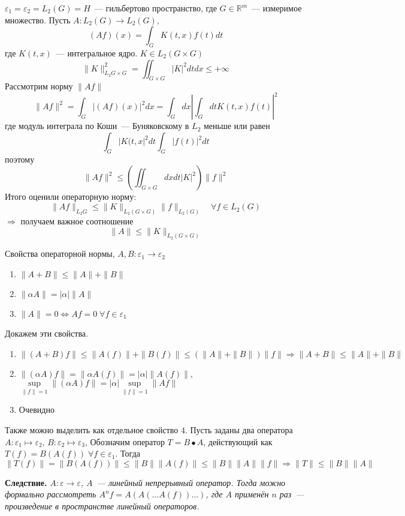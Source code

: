 \documentclass[14pt]{extarticle}
\begin{document}
\begin{Prim}
    $\varepsilon_1 = \varepsilon_2 = L_2(G) = H$~--- гильбертово пространство, где $G \in \mathbb R^m$~--- измеримое множество.
    Пусть $A : L_2(G) \to L_2(G)$, 
    $$
    (Af)(x) = \int_G K(t, x) f(t) dt
    $$
    где $K(t, x)$~--- интегральное ядро.
    $K \in L_2(G \times G) $ 
    $$
    \|K\|^2_{L_2{G \times G}} = \iint_{G \times G} |K|^2 dt dx \le +\infty
    $$
    Рассмотрим норму $\|Af\|$
    $$
    \|Af\|^2 = \int_{G} |(Af)(x)|^2 dx = \int_G dx \left| \int_G dt K(t, x) f(t) \right|^2
    $$
    где модуль интеграла по Коши~--- Буняковскому в $L_2$ 
    меньше или равен 
    $$
    \int_G |K(t, x|^2 dt \int_G |f(t)|^2 dt
    $$
    поэтому
    $$
    \|Af\|^2 \le \left(\iint_{G \times G} dx dt |K|^2 \right)\|f\|^2
    $$
    Итого оценили операторную норму:
    $$
    \|Af\|_{L_2{G}} \le \|K\|_{L_2(G \times G)}\|f\|_{L_2(G)} \quad \forall f \in L_2(G)
    $$
    $\Rightarrow$ получаем важное соотношение
    $$
    \boxed{\|A\| \le \|K\|_{L_2(G \times G)}}
    $$
\end{Prim}

Свойства операторной нормы, $A, B : \varepsilon_1 \to \varepsilon_2$
\begin{enumerate}
    \item{$\|A + B\| \le \|A\| + \|B\|$}
    \item{$\|\alpha A\| = |\alpha| \|A\|$}
    \item{$\|A\| = 0 \Leftrightarrow Af = 0 \; \forall f \in \varepsilon_1$}
\end{enumerate}
Докажем эти свойства.
\begin{enumerate}
    \item{$\|(A + B)f\| \le \|A(f)\| + \|B(f)\| \le (\|A\| + \|B\|)\|f\| \Rightarrow \|A + B\| \le \|A\| + \|B\|$}
    \item{$\|(\alpha A)f\| = \|\alpha A(f)\| = |\alpha| \|A(f)\|$, $\sup \limits_{\|f\| = 1} \|(\alpha A)f\| = |\alpha| \sup \limits_{\|f\| = 1} \|Af\|$}
    \item{Очевидно}
\end{enumerate}
Также можно выделить как отдельное свойство 4.
Пусть заданы два оператора $A : \varepsilon_1 \mapsto \varepsilon_2$, $B : \varepsilon_2 \mapsto \varepsilon_3$, Обозначим оператор $T = B \bullet A$, действующий как $T(f) = B(A(f))\; \forall f \in \varepsilon_1$.
Тогда 
$$
\|T(f)\| = \|B(A(f))\| \le \|B\|\|A(f)\| \le \|B\|\|A\|\|f\| \Rightarrow  \boxed{\|T\| \le \|B\|\|A\|}
$$

\textbf{Следствие. }
{\sl
$A : \varepsilon \to \varepsilon$, $A$~--- линейный непрерывный оператор.
Тогда можно формально рассмотреть $A^n f = A(A(\dots A(f)) \dots )$, где $A$ 
применён  $n$ раз~--- произведение в пространстве линейный операторов.
}
\end{document}
